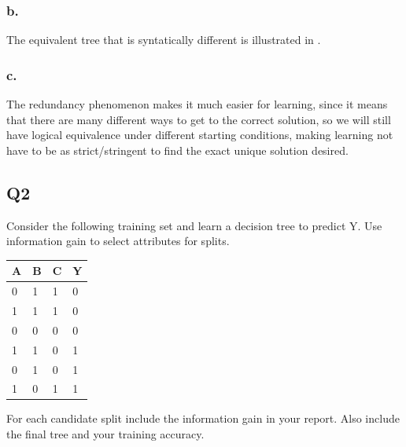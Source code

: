 \documentclass{article}
\theoremstyle{definition}
\begin{document}
        \subsubsection*{b.}
        The equivalent tree that is syntatically different is illustrated in
         .
        \subsubsection*{c.}
            The redundancy phenomenon makes it much easier for learning, 
            since it means that there are many different ways to get to the 
            correct solution, so we will still have logical equivalence 
            under different starting conditions, making learning not have 
            to be as strict/stringent to find the exact unique solution 
            desired.
    \subsection*{Q2}
        \begin{mdframed}
            Consider the following training set and learn a decision 
            tree to predict Y. Use information gain to select attributes 
            for splits.
            \begin{center}
                \begin{tabular}{lll|l}
                    A & B & C & Y \\
                    \hline
                    0 & 1 & 1 & 0 \\
                    1 & 1 & 1 & 0 \\
                    0 & 0 & 0 & 0 \\
                    1 & 1 & 0 & 1 \\
                    0 & 1 & 0 & 1 \\
                    1 & 0 & 1 & 1
                \end{tabular}
            \end{center}
            For each candidate split include the information gain in your 
            report. Also include the final tree and your training accuracy.
        \end{mdframed}
\end{document}
